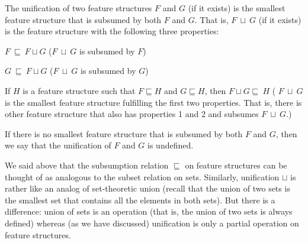 \documentclass{article}
\begin{document}
\begin{CJK}{UTF8}{gbsn}
The unification of two feature structures $F$  and $G$  (if it exists) is the smallest feature structure that is subsumed by both $F$  and $G$. That is, $F\ \sqcup \ G$  (if it exists) is the feature structure with the following three properties: 
\begin{enumerate*}
\item $F\ \sqsubseteq \ F\sqcup G$ ($F\ \sqcup \ G$ is subsumed by $F$)
\item $G\ \sqsubseteq \ F\sqcup G$ ($F\ \sqcup \ G$ is subsumed by $G$)
\item If $H$ is a feature structure such that $F\sqsubseteq H$ and $G\sqsubseteq H$, then $F\sqcup G \sqsubseteq \ H$ ( $F\ \sqcup \ G$ is the smallest feature structure fulfilling the first two properties. That is, there is other feature structure that also has properties 1 and 2 and subsumes $F\ \sqcup \ G$.)
\end{enumerate*}

If there is no smallest feature structure that is subsumed by both $F$  and $G$, then we say that the unification of $F$  and $G$ is undefined. 

We said above that the subsumption relation $\sqsubseteq$  on feature structures can be thought of as analogous to the subset relation on sets. Similarly, unification $\sqcup$  is rather like an analog of set-theoretic union (recall that the union of two sets is the smallest set that contains all the elements in both sets). But there is a difference: union of sets is an operation  (that is, the union of two sets is always defined) whereas (as we have discussed) unification is only a partial operation on feature structures.


\end{CJK}
\end{document}

